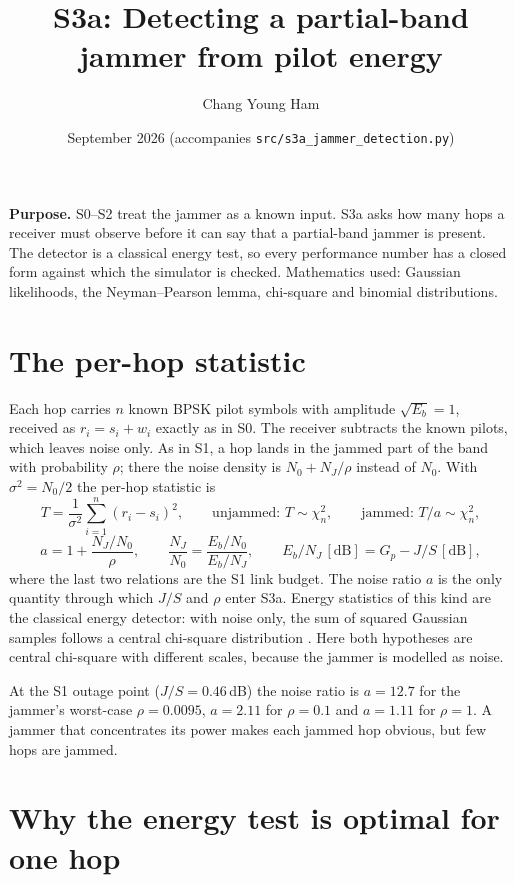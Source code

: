 \documentclass[11pt,a4paper]{article}
\title{S3a: Detecting a partial-band jammer from pilot energy}
\author{Chang Young Ham}
\date{September 2026 \quad (accompanies \texttt{src/s3a\_jammer\_detection.py})}
\newcommand{\EbNo}{E_b/N_0}
\newcommand{\EbNJ}{E_b/N_J}
\begin{document}
\maketitle

\noindent\textbf{Purpose.}
S0--S2 treat the jammer as a known input. S3a asks how many hops a receiver
must observe before it can say that a partial-band jammer is present. The
detector is a classical energy test, so every performance number has a closed
form against which the simulator is checked.
Mathematics used: Gaussian likelihoods, the Neyman--Pearson lemma, chi-square
and binomial distributions.

\section{The per-hop statistic}

Each hop carries $n$ known BPSK pilot symbols with amplitude $\sqrt{E_b}=1$,
received as $r_i = s_i + w_i$ exactly as in S0. The receiver subtracts the known
pilots, which leaves noise only. As in S1, a hop lands in the jammed part of the
band with probability $\rho$; there the noise density is $N_0 + N_J/\rho$
instead of $N_0$. With $\sigma^2 = N_0/2$ the per-hop statistic is
\begin{equation}
T = \frac{1}{\sigma^2}\sum_{i=1}^{n}(r_i - s_i)^2,\qquad
\text{unjammed: } T\sim\chi^2_n,\qquad
\text{jammed: } T/a\sim\chi^2_n,
\label{eq:T}
\end{equation}
\begin{equation}
a = 1 + \frac{N_J/N_0}{\rho},\qquad
\frac{N_J}{N_0} = \frac{\EbNo}{\EbNJ},\qquad
\EbNJ\,[\mathrm{dB}] = G_p - J/S\,[\mathrm{dB}],
\label{eq:a}
\end{equation}
where the last two relations are the S1 link budget. The noise ratio $a$ is the
only quantity through which $J/S$ and $\rho$ enter S3a. Energy statistics of
this kind are the classical energy detector: with noise only, the sum of squared
Gaussian samples follows a central chi-square distribution \cite{urkowitz}.
Here both hypotheses are central chi-square with different scales, because the
jammer is modelled as noise.

At the S1 outage point ($J/S = 0.46$\,dB) the noise ratio is $a = 12.7$ for the
jammer's worst-case $\rho = 0.0095$, $a = 2.11$ for $\rho = 0.1$ and
$a = 1.11$ for $\rho = 1$. A jammer that concentrates its power makes each
jammed hop obvious, but few hops are jammed.

\section{Why the energy test is optimal for one hop}
\end{document}
